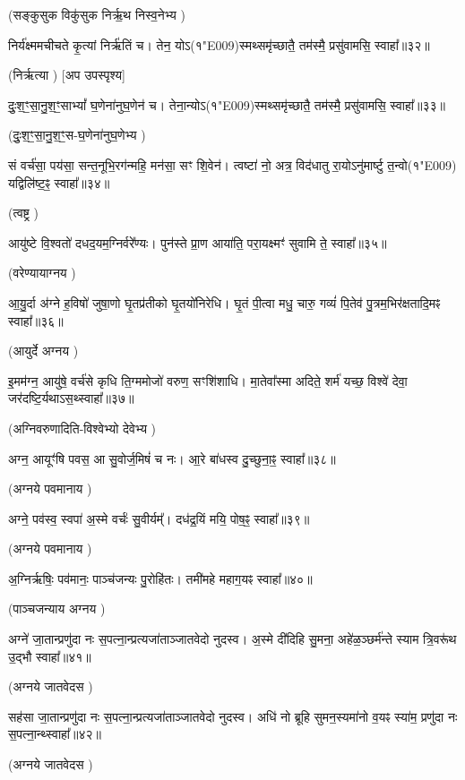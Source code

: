 (सङ्कुसुक विकु॑सुक निर्\mbox{}ऋ॒थ निस्व॒नेभ्य \idam)


निर्य॑क्ष्ममचीचते कृ॒त्यां निर्\mbox{}ऋ॑तिं च। 
तेन॒ योऽ(१\char"E009)स्मथ्समृ॑च्छातै॒ तम॑स्मै॒ प्रसु॑वामसि॒ स्वाहा᳚॥३२॥

(निर्\mbox{}ऋत्या \idam) [अप उपस्पृश्य]


दुः॒श॒ꣳ॒सा॒नु॒श॒ꣳ॒साभ्यां᳚ घ॒णेना॑नुघ॒णेन॑ च। 
तेना॒न्योऽ(१\char"E009)स्मथ्समृ॑च्छातै॒ तम॑स्मै॒ प्रसु॑वामसि॒ स्वाहा᳚॥३३॥

(दुः॒श॒ꣳ॒सा॒नु॒श॒ꣳ॒स-घ॒णेना॑नुघ॒णेभ्य \idam)



सं वर्च॑सा॒ पय॑सा॒ सन्त॒नूभि॒रग॑न्महि॒ मन॑सा॒ सꣳ शि॒वेन॑। 
त्वष्टा॑ नो॒ अत्र॒ विद॑धातु रा॒योऽनु॑मार्ष्टु त॒न्वो(१\char"E009) यद्विलि॑ष्ट॒ꣴ॒ स्वाहा᳚॥३४॥

(त्वष्ट्र \idam)


आयु॑ष्टे वि॒श्वतो॑ दधद॒यम॒ग्निर्वरे᳚ण्यः। 
पुन॑स्ते प्रा॒ण आया॑ति॒ परा॒यक्ष्मꣳ॑ सुवामि ते॒ स्वाहा᳚॥३५॥

(वरेण्यायाग्नय \idam)


आ॒यु॒र्दा अ॑ग्ने ह॒विषो॑ जुषा॒णो घृ॒तप्र॑तीको घृ॒तयो॑निरेधि। 
घृ॒तं पी॒त्वा मधु॒ चारु॒ गव्यं॑ पि॒तेव॑ पु॒त्रम॒भिर॑क्षतादि॒मꣴ स्वाहा᳚॥३६॥

(आयुर्दे अग्नय \idam)


इ॒मम॑ग्न॒ आयु॑षे॒ वर्च॑से कृधि ति॒ग्ममोजो॑ वरुण॒ सꣳशि॑शाधि। 
मा॒तेवा᳚स्मा अदिते॒ शर्म॑ यच्छ॒ विश्वे॑ देवा॒ जर॑दष्टि॒र्यथा\-ऽस॒थ्स्वाहा᳚॥३७॥

(अग्निवरुणादिति-विश्वेभ्यो देवेभ्य \idam)


अग्न॒ आयूꣳ॑षि पवस॒ आ सु॒वोर्ज॒मिषं॑ च नः। 
आ॒रे बा॑धस्व दु॒च्छुना॒ꣴ॒ स्वाहा᳚॥३८॥

(अग्नये पवमानाय \idam)

अग्ने॒ पव॑स्व॒ स्वपा॑ अ॒स्मे वर्चः॑ सु॒वीर्यम्᳚। 
दध॑द्र॒यिं मयि॒ पोष॒ꣴ॒ स्वाहा᳚॥३९॥

(अग्नये पवमानाय \idam)


अ॒ग्निर्\mbox{}ऋषिः॒ पव॑मानः॒ पाञ्च॑जन्यः पु॒रोहि॑तः। 
तमी॑महे महाग॒यꣴ स्वाहा᳚॥४०॥

(पाञ्चजन्याय अग्नय \idam)


अग्ने॑ जा॒तान्प्रणु॑दा नः स॒पत्ना॒न्प्रत्यजा॑ताञ्जातवेदो नुदस्व। 
अ॒स्मे दी॑दिहि सु॒मना॒ अहे॑ळ॒ञ्छर्म॑न्ते स्याम त्रि॒वरू॑थ उ॒द्भौ स्वाहा᳚॥४१॥

(अग्नये जातवेदस \idam)


सह॑सा जा॒तान्प्रणु॑दा नः स॒पत्ना॒न्प्रत्यजा॑ताञ्जातवेदो नुदस्व। 
अधि॑ नो ब्रूहि सुमन॒स्यमा॑नो व॒यꣴ स्या॑म॒ प्रणु॑दा नः स॒पत्ना॒न्थ्स्वाहा᳚॥४२॥

(अग्नये जातवेदस \idam)


